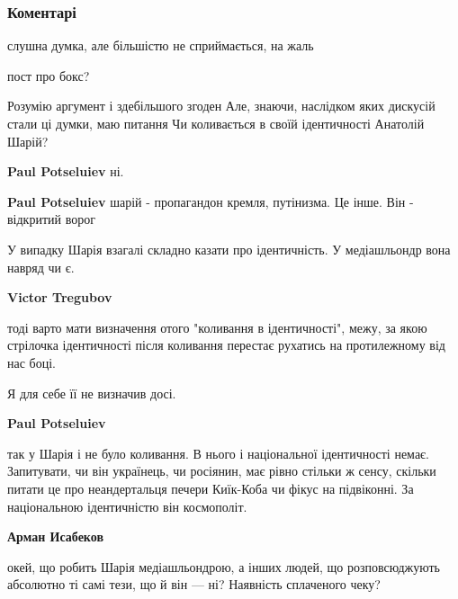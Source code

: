  
 
 
 
 
\subsubsection{Коментарі}

\begin{itemize} %
слушна думка, але більшістю не сприймається, на жаль

пост про бокс?

Розумію аргумент і здебільшого згоден
Але, знаючи, наслідком яких дискусій стали ці думки, маю питання
Чи коливається в своїй ідентичності Анатолій Шарій?

\begin{itemize} %
\textbf{Paul Potseluiev} ні.

\textbf{Paul Potseluiev} шарій - пропагандон кремля, путінизма. Це інше. Він - відкритий ворог

У випадку Шарія взагалі складно казати про ідентичність. У медіашльондр вона навряд чи є.

\textbf{Victor Tregubov} 

тоді варто мати визначення отого "коливання в ідентичності", межу, за якою
стрілочка ідентичності після коливання перестає рухатись на протилежному від
нас боці.

Я для себе її не визначив досі.


\textbf{Paul Potseluiev} 

так у Шарія і не було коливання. В нього і національної ідентичності немає.
Запитувати, чи він українець, чи росіянин, має рівно стільки ж сенсу, скільки
питати це про неандертальця печери Киїк-Коба чи фікус на підвіконні. За
національною ідентичністю він космополіт.


\textbf{Арман Исабеков} 

окей, що робить Шарія медіашльондрою, а інших людей, що розповсюджують
абсолютно ті самі тези, що й він — ні? Наявність сплаченого чеку?


\end{itemize}
\end{itemize}
